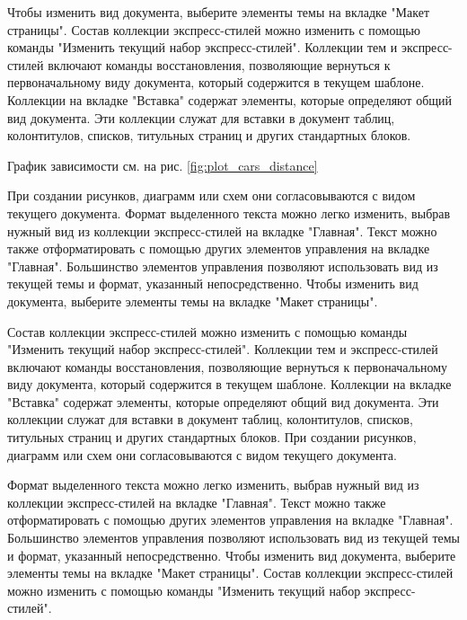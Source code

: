 \documentclass{article}
\begin{document}
Чтобы изменить вид документа, выберите элементы темы на вкладке "Макет страницы". Состав коллекции экспресс-стилей можно изменить с помощью команды "Изменить текущий набор экспресс-стилей". Коллекции тем и экспресс-стилей включают команды восстановления, позволяющие вернуться к первоначальному виду документа, который содержится в текущем шаблоне. Коллекции на вкладке "Вставка" содержат элементы, которые определяют общий вид документа. Эти коллекции служат для вставки в документ таблиц, колонтитулов, списков, титульных страниц и других стандартных блоков.

График зависимости см. на рис. \ref{fig:plot_cars_distance}

При создании рисунков, диаграмм или схем они согласовываются с видом текущего документа. Формат выделенного текста можно легко изменить, выбрав нужный вид из коллекции экспресс-стилей на вкладке "Главная". Текст можно также отформатировать с помощью других элементов управления на вкладке "Главная". Большинство элементов управления позволяют использовать вид из текущей темы и формат, указанный непосредственно. Чтобы изменить вид документа, выберите элементы темы на вкладке "Макет страницы".




Состав коллекции экспресс-стилей можно изменить с помощью команды "Изменить текущий набор экспресс-стилей". Коллекции тем и экспресс-стилей включают команды восстановления, позволяющие вернуться к первоначальному виду документа, который содержится в текущем шаблоне. Коллекции на вкладке "Вставка" содержат элементы, которые определяют общий вид документа. Эти коллекции служат для вставки в документ таблиц, колонтитулов, списков, титульных страниц и других стандартных блоков. При создании рисунков, диаграмм или схем они согласовываются с видом текущего документа.

Формат выделенного текста можно легко изменить, выбрав нужный вид из коллекции экспресс-стилей на вкладке "Главная". Текст можно также отформатировать с помощью других элементов управления на вкладке "Главная". Большинство элементов управления позволяют использовать вид из текущей темы и формат, указанный непосредственно. Чтобы изменить вид документа, выберите элементы темы на вкладке "Макет страницы". Состав коллекции экспресс-стилей можно изменить с помощью команды "Изменить текущий набор экспресс-стилей".
\end{document}
